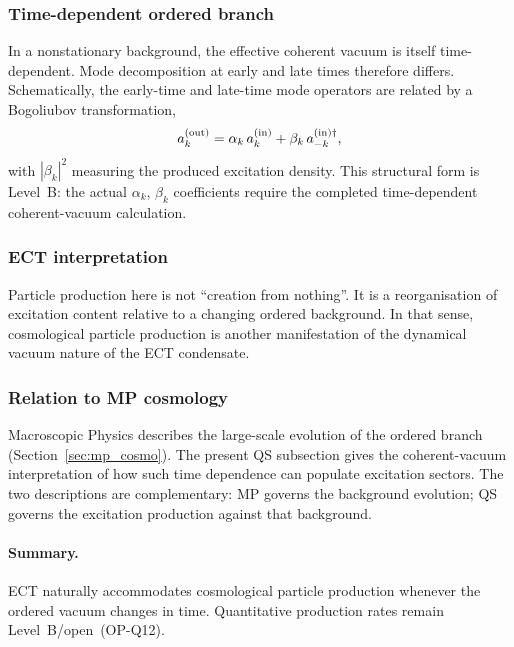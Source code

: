 \subsubsection*{Time-dependent ordered branch}

In a nonstationary background, the effective coherent vacuum is itself
time-dependent.
Mode decomposition at early and late times therefore differs.
Schematically, the early-time and late-time mode operators are related
by a Bogoliubov transformation,
\begin{equation}
  \label{eq:qs_bogoliubov}
  a_k^{\rm(out)}
  =
  \alpha_k\,a_k^{\rm(in)}
  +
  \beta_k\,a_{-k}^{\rm(in)\dagger},
\end{equation}
with $|\beta_k|^2$ measuring the produced excitation density.
This structural form is Level~B: the actual $\alpha_k$, $\beta_k$
coefficients require the completed time-dependent coherent-vacuum
calculation.

\subsubsection*{ECT interpretation}

Particle production here is not ``creation from nothing''.
It is a reorganisation of excitation content relative to a changing
ordered background.
In that sense, cosmological particle production is another
manifestation of the dynamical vacuum nature of the ECT condensate.

\subsubsection*{Relation to MP cosmology}

Macroscopic Physics describes the large-scale evolution of the ordered
branch (Section~\ref{sec:mp_cosmo}).
The present QS subsection gives the coherent-vacuum interpretation of
how such time dependence can populate excitation sectors.
The two descriptions are complementary: MP governs the background
evolution; QS governs the excitation production against that background.

\paragraph{Summary.}
ECT naturally accommodates cosmological particle production whenever
the ordered vacuum changes in time.
Quantitative production rates remain Level~B/open~(OP-Q12).

